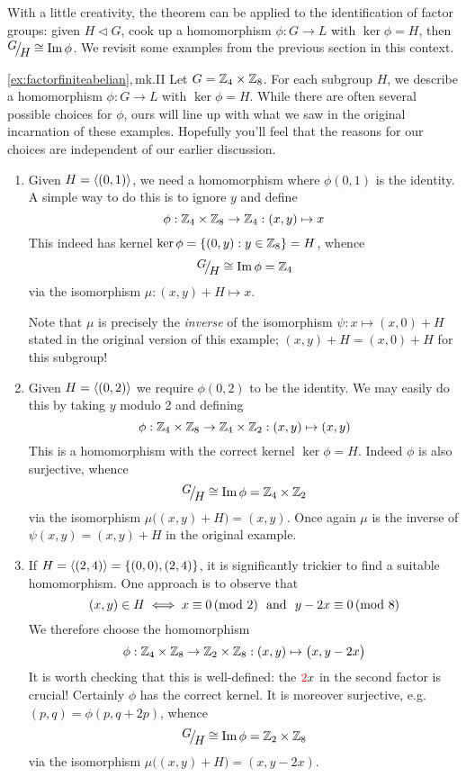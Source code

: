 \goodbreak


With a little creativity, the theorem can be applied to the identification of factor groups: given $H\triangleleft G$, cook up a homomorphism $\phi:G\to L$ with $\ker\phi=H$, then $\quotient GH\cong\image\phi$. We revisit some examples from the previous section in this context.

\begin{examples*}{\ref{ex:factorfiniteabelian},\,mk.II}{}
	Let $G=\mathbb{Z}_4\times\mathbb{Z}_8$. For each subgroup $H$, we describe a homomorphism $\phi:G\to L$ with $\ker\phi =H$. While there are often several possible choices for $\phi$, ours will line up with what we saw in the original incarnation of these examples. Hopefully you'll feel that the reasons for our choices are independent of our earlier discussion. %
	\begin{enumerate}
	  \item Given $H=\left\langle (0,1)\right\rangle$, we need a homomorphism where $\phi(0,1)$ is the identity. A simple way to do this is to ignore $y$ and define
	  \[
	  	\phi:\mathbb{Z}_4\times\mathbb{Z}_8\to\mathbb{Z}_4:(x,y)\mapsto x
	  \]
	  This indeed has kernel $\ker\phi=\{(0,y):y\in\mathbb{Z}_8\} =H$, whence
	  \[
	  	\quotient GH\cong\image\phi=\Z_4
	  \]
	  via the isomorphism $\mu:(x,y)+H\mapsto x$.\par
	  Note that $\mu$ is precisely the \emph{inverse} of the isomorphism $\psi:x\mapsto (x,0)+H$ stated in the original version of this example; $(x,y)+H=(x,0)+H$ for this subgroup!
	
	  \item Given $H=\left\langle (0,2)\right\rangle$ we require $\phi(0,2)$ to be the identity. We may easily do this by taking $y$ modulo 2 and defining
	  \[
	  	\phi:\mathbb{Z}_4\times\mathbb{Z}_8\to\mathbb{Z}_4\times\mathbb{Z}_2:(x,y)\mapsto (x,y)
	  \]
	  This is a homomorphism with the correct kernel $\ker\phi=H$. Indeed $\phi$ is also surjective, whence
	  \[
	  	\quotient GH\cong \image\phi= \Z_4\times\Z_2
	  \]
	  via the isomorphism $\mu\bigl((x,y)+H\bigr) =(x,y)$. Once again $\mu$ is the inverse of $\psi(x,y)=(x,y)+H$ in the original example.
	  
	  \item If $H=\left\langle (2,4)\right\rangle=\{(0,0),(2,4)\}$, it is significantly trickier to find a suitable homomorphism. One approach is to observe that
	  \[
	  	(x,y)\in H\iff x\equiv 0\negthickspace\pmod 2\ \text{ and }\ y-2x\equiv 0\negthickspace\pmod 8
	  \]
	  We therefore choose the homomorphism
	  \[
	 		\phi:\mathbb{Z}_4\times\mathbb{Z}_8\to\mathbb{Z}_2\times\mathbb{Z}_8:(x,y)\mapsto\bigl(x,y-2x\bigr)
	 	\]
	  It is worth checking that this is well-defined: the $\textcolor{red}{2}x$ in the second factor is crucial! Certainly $\phi$ has the correct kernel. It is moreover surjective, e.g.\ $(p,q)=\phi(p,q+2p)$, whence
	  \[
	  	\quotient GH\cong\image\phi=\Z_2\times\Z_8
	  \]
	  via the isomorphism $\mu\bigl((x,y)+H\bigr)=(x,y-2x)$.
	\end{enumerate}
\end{examples*}

